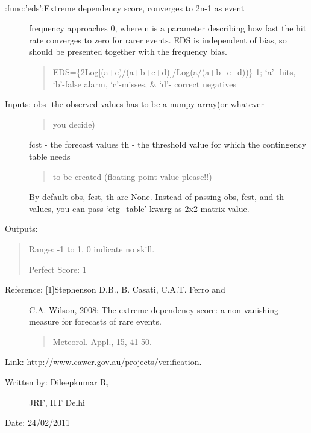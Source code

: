 \documentclass[letterpaper,10pt,english]{sphinxmanual}
\begin{document}
\begin{fulllineitems}
\label{diagnosis:ctgfunction.eds}~\begin{description}
\item[{:func:'eds':Extreme dependency score, converges to 2n-1 as event}] \leavevmode
frequency approaches 0, where n is a parameter describing how
fast the hit rate converges to zero for rarer events. EDS is
independent of bias, so should be presented together with the
frequency bias.
\begin{quote}

EDS=\{2Log{[}(a+c)/(a+b+c+d){]}/Log(a/(a+b+c+d))\}-1; `a' -hits,
`b'-false alarm, `c'-misses, \& `d'- correct negatives
\end{quote}

\item[{Inputs: obs- the observed values has to be a numpy array(or whatever}] \leavevmode\begin{quote}

you decide)
\end{quote}

fcst - the forecast values
th  - the threshold value for which the contingency table needs
\begin{quote}

to be created (floating point value please!!)
\end{quote}

By default obs, fcst, th are None. Instead of passing obs, fcst,
and th values, you can pass `ctg\_table' kwarg as 2x2 matrix value.

\end{description}

Outputs:
\begin{quote}

Range: -1 to 1, 0 indicate no skill.

Perfect Score: 1
\end{quote}
\begin{description}
\item[{Reference: {[}1{]}Stephenson D.B., B. Casati, C.A.T. Ferro and}] \leavevmode
C.A. Wilson, 2008: The extreme dependency score:
a non-vanishing measure for forecasts of rare events.
\begin{quote}

Meteorol. Appl., 15, 41-50.
\end{quote}

\end{description}

Link:    \href{http://www.cawcr.gov.au/projects/verification}{http://www.cawcr.gov.au/projects/verification}.
\begin{description}
\item[{Written by: Dileepkumar R,}] \leavevmode
JRF, IIT Delhi

\end{description}

Date: 24/02/2011

\end{fulllineitems}
\end{document}

